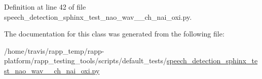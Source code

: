 Definition at line 42 of file speech\-\_\-detection\-\_\-sphinx\-\_\-test\-\_\-nao\-\_\-wav\-\_\-\_\-ch\-\_\-nai\-\_\-oxi.\-py.



The documentation for this class was generated from the following file\-:\begin{DoxyCompactItemize}
\item 
/home/travis/rapp\-\_\-temp/rapp-\/platform/rapp\-\_\-testing\-\_\-tools/scripts/default\-\_\-tests/\hyperlink{speech__detection__sphinx__test__nao__wav__1__ch__nai__oxi_8py}{speech\-\_\-detection\-\_\-sphinx\-\_\-test\-\_\-nao\-\_\-wav\-\_\-\_\-ch\-\_\-nai\-\_\-oxi.\-py}\end{DoxyCompactItemize}
